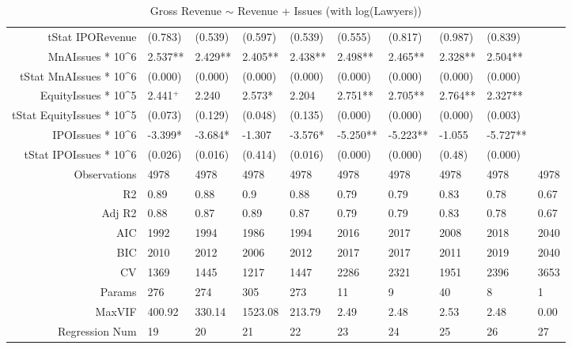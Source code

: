 \begin{table}[ht]
\begin{tabular}{rlllllllll}
  tStat IPORevenue & (0.783) & (0.539) & (0.597) & (0.539) & (0.555) & (0.817) & (0.987) & (0.839) &  \\ 
  MnAIssues * 10^6 & 2.537** & 2.429** & 2.405** & 2.438** & 2.498** & 2.465** & 2.328** & 2.504** &  \\ 
  tStat MnAIssues * 10^6 & (0.000) & (0.000) & (0.000) & (0.000) & (0.000) & (0.000) & (0.000) & (0.000) &  \\ 
  EquityIssues * 10^5 & 2.441$^{+}$ & 2.240 & 2.573* & 2.204 & 2.751** & 2.705** & 2.764** & 2.327** &  \\ 
  tStat EquityIssues * 10^5 & (0.073) & (0.129) & (0.048) & (0.135) & (0.000) & (0.000) & (0.000) & (0.003) &  \\ 
  IPOIssues * 10^6 & -3.399* & -3.684* & -1.307 & -3.576* & -5.250** & -5.223** & -1.055 & -5.727** &  \\ 
  tStat IPOIssues * 10^6 & (0.026) & (0.016) & (0.414) & (0.016) & (0.000) & (0.000) & (0.48) & (0.000) &  \\ 
  Observations & 4978 & 4978 & 4978 & 4978 & 4978 & 4978 & 4978 & 4978 & 4978 \\ 
  R2 & 0.89 & 0.88 & 0.9 & 0.88 & 0.79 & 0.79 & 0.83 & 0.78 & 0.67 \\ 
  Adj R2 & 0.88 & 0.87 & 0.89 & 0.87 & 0.79 & 0.79 & 0.83 & 0.78 & 0.67 \\ 
  AIC & 1992 & 1994 & 1986 & 1994 & 2016 & 2017 & 2008 & 2018 & 2040 \\ 
  BIC & 2010 & 2012 & 2006 & 2012 & 2017 & 2017 & 2011 & 2019 & 2040 \\ 
  CV & 1369 & 1445 & 1217 & 1447 & 2286 & 2321 & 1951 & 2396 & 3653 \\ 
  Params & 276 & 274 & 305 & 273 & 11 & 9 & 40 & 8 & 1 \\ 
  MaxVIF & 400.92 & 330.14 & 1523.08 & 213.79 & 2.49 & 2.48 & 2.53 & 2.48 & 0.00 \\ 
  Regression Num & 19 & 20 & 21 & 22 & 23 & 24 & 25 & 26 & 27 \\ 
   \hline
\end{tabular}
\caption{Gross Revenue $\sim$ Revenue + Issues (with log(Lawyers))} 
\end{table}
